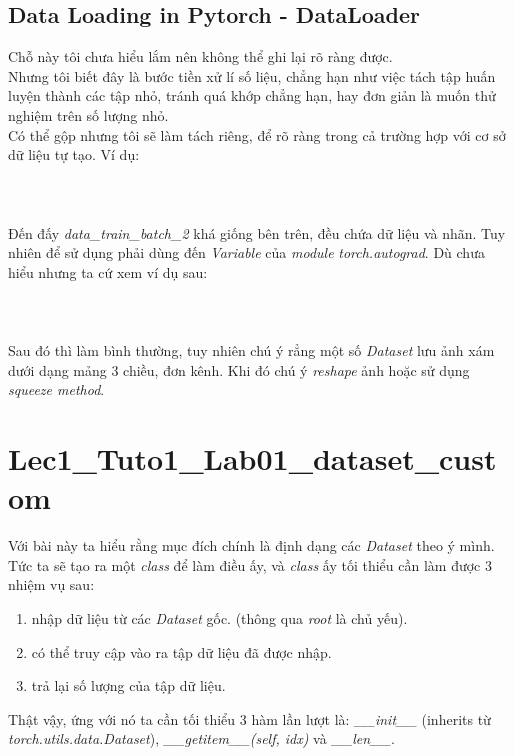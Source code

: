 \documentclass{article}
\begin{document}
    \subsection{Data Loading in Pytorch - DataLoader}
    Chỗ này tôi chưa hiểu lắm nên không thể ghi lại rõ ràng được.\\
    Nhưng tôi biết đây là bước tiền xử lí số liệu, chẳng hạn như việc tách tập huấn luyện thành các tập nhỏ, tránh quá khớp chẳng hạn, hay đơn giản là muốn thử nghiệm trên số lượng nhỏ.\\
    Có thể gộp nhưng tôi sẽ làm tách riêng, để rõ ràng trong cả trường hợp với cơ sở dữ liệu tự tạo. Ví dụ: \\ \\
    \\ \\
    Đến đấy \textit{data\_train\_batch\_2} khá giống bên trên, đều chứa dữ liệu và nhãn. Tuy nhiên để sử dụng phải dùng đến \textit{Variable} của \textit{module} \textit{torch.autograd}. Dù chưa hiểu nhưng ta cứ xem ví dụ sau:\\ \\
    \\ \\
    Sau đó thì làm bình thường, tuy nhiên chú ý rẳng một số \textit{Dataset} lưu ảnh xám dưới dạng mảng 3 chiều, đơn kênh. Khi đó chú ý \textit{reshape} ảnh hoặc sử dụng \textit{squeeze method}. 
\section{Lec1\_Tuto1\_Lab01\_dataset\_custom}
Với bài này ta hiểu rằng mục đích chính là định dạng các \textit{Dataset} theo ý mình. Tức ta sẽ tạo ra một \textit{class} để làm điều ấy, và \textit{class} ấy tối thiểu cần làm được 3 nhiệm vụ sau:
\begin{enumerate}
    \item nhập dữ liệu từ các \textit{Dataset} gốc. (thông qua \textit{root} là chủ yếu).
    \item có thể truy cập vào ra tập dữ liệu đã được nhập.
    \item trả lại số lượng của tập dữ liệu.
\end{enumerate}
Thật vậy, ứng với nó ta cần tối thiểu 3 hàm lần lượt là: \textit{\_\_init\_\_} (inherits từ \textit{torch.utils.data.Dataset}), \textit{\_\_getitem\_\_(self, idx)} và \textit{\_\_len\_\_}.
\end{document}
